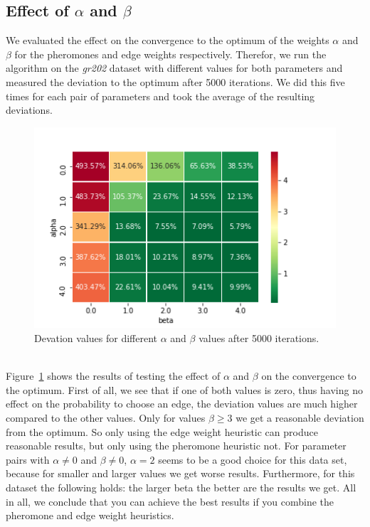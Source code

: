 \documentclass{article}
\begin{document}
\subsection{Effect of $\alpha$ and $\beta$}
We evaluated the effect on the convergence to the optimum of the weights $\alpha$ and $\beta$ for the pheromones and edge weights respectively. Therefor, we run the algorithm on the \textit{gr202} dataset with different values for both parameters and measured the deviation to the optimum after 5000 iterations. We did this five times for each pair of parameters and took the average of the resulting deviations.
\begin{figure}[h]
  \center
  \includegraphics[width=0.5\paperwidth]{alpha-beta-heatmap.png}
  \caption{Devation values for different $\alpha$ and $\beta$ values after 5000 iterations.}
  \label{fig:alpha-beta}
\end{figure}
\\
Figure~\ref{fig:alpha-beta} shows the results of testing the effect of $\alpha$ and $\beta$ on the convergence to the optimum. First of all, we see that if one of both values is zero, thus having no effect on the probability to choose an edge, the deviation values are much higher compared to the other values. Only for values $\beta \geq 3$ we get a reasonable deviation from the optimum. So only using the edge weight heuristic can produce reasonable results, but only using the pheromone heuristic not. For parameter pairs with $\alpha \neq 0$ and $\beta \neq 0$, $\alpha = 2$ seems to be a good choice for this data set, because for smaller and larger values we get worse results. Furthermore, for this dataset the following holds: the larger beta the better are the results we get. All in all, we conclude that you can achieve the best results if you combine the pheromone and edge weight heuristics.
\end{document}
